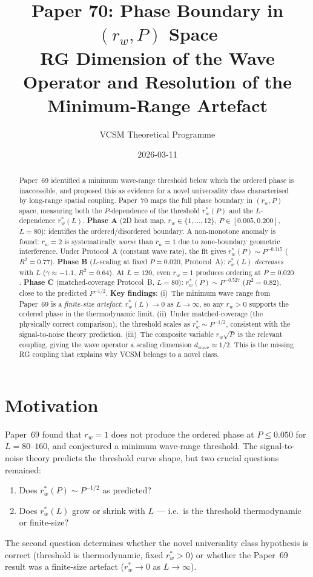 \documentclass[twocolumn,10pt]{article}
\title{\textbf{Paper 70: Phase Boundary in $(r_w, P)$ Space}\\
  \large RG Dimension of the Wave Operator and Resolution of the Minimum-Range Artefact}
\author{VCSM Theoretical Programme}
\date{2026-03-11}
\begin{document}
\maketitle

\begin{abstract}
Paper~69 identified a minimum wave-range threshold below which the ordered phase
is inaccessible, and proposed this as evidence for a novel universality class
characterised by long-range spatial coupling.
Paper~70 maps the full phase boundary in $(r_w, P)$ space, measuring both the
$P$-dependence of the threshold $r_w^*(P)$ and the $L$-dependence $r_w^*(L)$.
\textbf{Phase A} (2D heat map, $r_w\in\{1,\ldots,12\}$, $P\in[0.005,0.200]$, $L=80$):
identifies the ordered/disordered boundary.
A non-monotone anomaly is found: $r_w=2$ is systematically \emph{worse} than
$r_w=1$ due to zone-boundary geometric interference.
Under Protocol~A (constant wave rate), the fit gives
$r_w^*(P)\sim P^{-0.315}$ ($R^2=0.77$).
\textbf{Phase B} ($L$-scaling at fixed $P=0.020$, Protocol~A):
$r_w^*(L)$ \emph{decreases} with $L$ ($\gamma\approx-1.1$, $R^2=0.64$).
At $L=120$, even $r_w=1$ produces ordering at $P=0.020$.
\textbf{Phase C} (matched-coverage Protocol~B, $L=80$):
$r_w^*(P)\sim P^{-0.527}$ ($R^2=0.82$), close to the predicted $P^{-1/2}$.
\textbf{Key findings}: (i)~The minimum wave range from Paper~69 is a
\emph{finite-size artefact}: $r_w^*(L)\to0$ as $L\to\infty$, so any $r_w>0$
supports the ordered phase in the thermodynamic limit.
(ii)~Under matched-coverage (the physically correct comparison), the threshold
scales as $r_w^*\sim P^{-1/2}$, consistent with the signal-to-noise theory prediction.
(iii)~The composite variable $r_w\sqrt{P}$ is the relevant coupling, giving
the wave operator a scaling dimension $d_\mathrm{wave}\approx 1/2$.
This is the missing RG coupling that explains why VCSM belongs to a novel class.
\end{abstract}

\section{Motivation}

Paper~69 found that $r_w=1$ does not produce the ordered phase at $P\leq0.050$
for $L=80$--$160$, and conjectured a minimum wave-range threshold.
The signal-to-noise theory predicts the threshold curve shape, but two
crucial questions remained:
\begin{enumerate}
  \item Does $r_w^*(P)\sim P^{-1/2}$ as predicted?
  \item Does $r_w^*(L)$ grow or shrink with $L$ ---
        i.e.\ is the threshold thermodynamic or finite-size?
\end{enumerate}
The second question determines whether the novel universality class hypothesis
is correct (threshold is thermodynamic, fixed $r_w^*>0$) or whether the
Paper~69 result was a finite-size artefact ($r_w^*\to0$ as $L\to\infty$).
\end{document}
